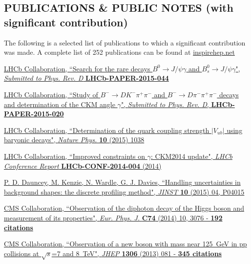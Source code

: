 \documentclass[margin, 10pt]{res} %
\begin{document}
\begin{resume}
\section{PUBLICATIONS \& PUBLIC NOTES \newline(with significant contribution)}
The following is a selected list of publications to which a significant contribution was made. A complete list of 252 publications
can be found at \href{https://inspirehep.net/search?ln=en&ln=en&p=Matthew+Kenzie&of=hb&action_search=Search&sf=earliestdate&so=d&rm=&rg=25&sc=0}{inspirehep.net}

\href{}
{
LHCb Collaboration, ``Search for the rare decays $B^{0}\rightarrow J/\psi\gamma$ and $B^{0}_{s}\rightarrow J/\psi\gamma$",
\textit{Submitted to Phys. Rev. D}
\textbf{LHCb-PAPER-2015-044}
}

\href{http://inspirehep.net/record/1373302}
{
LHCb Collaboration, ``Study of $B^{-}\rightarrow DK^{-}\pi^{+}\pi^{-}$ and $B^{-}\rightarrow D\pi^{-}\pi^{+}\pi^{-}$ decays and determination of the CKM angle $\gamma$",
\textit{Submitted to Phys. Rev. D},
\textbf{LHCb-PAPER-2015-020}
}

\href{http://inspirehep.net/record/1358215}
{
LHCb Collaboration, ``Determination of the quark coupling strength $|V_{ub}|$ using baryonic decays",
\textit{Nature Phys.}
\textbf{10} (2015) 1038
}

\href{http://inspirehep.net/record/1388239}
{
LHCb Collaboration, ``Improved constraints on $\gamma$: CKM2014 update",
\textit{LHCb Conference Report}
\textbf{LHCb-CONF-2014-004} (2014)
}

\href{http://inspirehep.net/record/1312971}
{
P. D. Dauncey, M. Kenzie, N. Wardle, G. J. Davies, ``Handling uncertainties in background shapes: the discrete profiling method",
\textit{JINST}
\textbf{10} (2015) 04, P04015
}

\href{http://inspirehep.net/record/1304454}
{
CMS Collaboration, ``Observation of the diphoton decay of the Higgs boson and measurement of its properties",
\textit{Eur. Phys. J.}
\textbf{C74} (2014) 10, 3076 - \textbf{192 citations}
}

\href{http://inspirehep.net/record/1224273}
{
CMS Collaboration, ``Observation of a new boson with mass near 125~GeV in pp collisions at $\sqrt{s}$=7 and 8~TeV",
\textit{JHEP}
\textbf{1306} (2013) 081 - \textbf{345 citations}
}


\end{resume}
\end{document}
